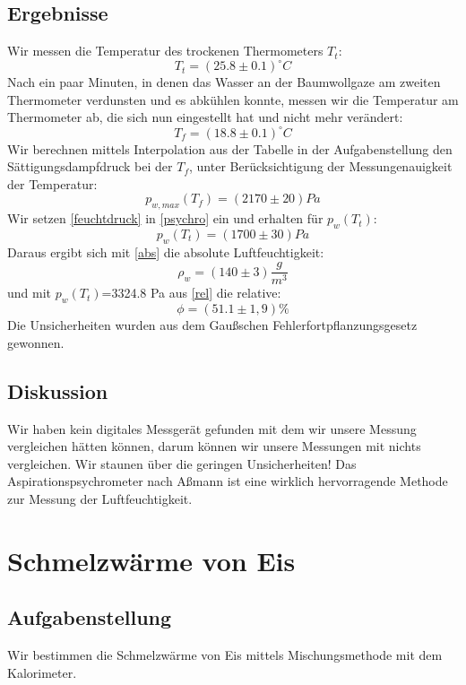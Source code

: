 \documentclass{article}
\begin{document}
\subsection{Ergebnisse}
Wir messen die Temperatur des trockenen Thermometers $T_t$:
$$T_t=(25.8 \pm 0.1) ^\circ C$$
Nach ein paar Minuten, in denen das Wasser an der Baumwollgaze am zweiten Thermometer verdunsten und es abkühlen konnte, messen wir die Temperatur am Thermometer ab, die sich nun eingestellt hat und nicht mehr verändert:
$$T_f=(18.8 \pm 0.1) ^\circ C $$ 
Wir berechnen mittels Interpolation aus der Tabelle in der Aufgabenstellung den Sättigungsdampfdruck bei der $T_f$, unter Berücksichtigung der Messungenauigkeit der Temperatur:
\begin{equation}
\label{feuchtdruck}
p_{w,max}(T_f)=(2170 \pm 20) Pa
\end{equation}
Wir setzen \ref{feuchtdruck} in \ref{psychro} ein und erhalten für $p_w(T_t)$:
$$p_w(T_t)=(1700 \pm 30) Pa $$
Daraus ergibt sich mit \ref{abs} die absolute Luftfeuchtigkeit:
$$\rho_w=(140 \pm 3) \frac{g}{m^3}$$
und mit $p_w(T_t)$=3324.8 Pa aus \ref{rel} die relative:
$$\phi=(51.1 \pm 1,9)\%$$
Die Unsicherheiten wurden aus dem Gaußschen Fehlerfortpflanzungsgesetz gewonnen.
\subsection{Diskussion}
Wir haben kein digitales Messgerät gefunden mit dem wir unsere Messung vergleichen hätten können, darum können wir unsere Messungen mit nichts vergleichen. Wir staunen über die geringen Unsicherheiten! Das Aspirationspsychrometer nach Aßmann ist eine wirklich hervorragende Methode zur Messung der Luftfeuchtigkeit.
\section{Schmelzwärme von Eis}
\subsection{Aufgabenstellung}
Wir bestimmen die Schmelzwärme von Eis mittels Mischungsmethode mit dem Kalorimeter.
\end{document}
